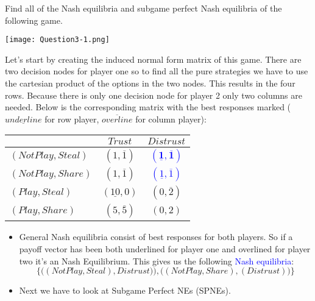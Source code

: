 \documentclass[../main.tex]{subfiles}
\begin{document}
\begin{question}
    Find all of the Nash equilibria and subgame perfect Nash equilibria of the following game.

    \centering
    \texttt{[image: Question3-1.png]}
\end{question}

\begin{solution} 
Let's start by creating the induced normal form matrix of this game. 
There are two decision nodes for player one so to find all the pure strategies we have to use the cartesian product of the options in the two nodes. This results in the four rows.
Because there is only one decision node for player 2 only two columns are needed.
Below is the corresponding matrix with the best responses marked ($\underline{underline}$ for row player, $\overline{overline}$ for column player): 
\begin{center}
	\setlength\extrarowheight{1pt} %
	\begin{tabular}{|l|c|c|}
		\hline
		& $Trust$ & $Distrust$ \\
		\hline
		$(Not Play,Steal)$ & $(1,\overline{1})$ & \textcolor{blue}{$\mathbf{(\underline{1},\overline{1})}$} \\
		\hline
		$(Not Play,Share)$ & $(1,\overline{1})$ & \textcolor{blue}{$(\underline{1},\overline{1})$} \\
		\hline
		$(Play,Steal)$ & $(\underline{10},0)$ & $(0,\overline{2})$ \\
		\hline
		$(Play,Share)$ & $(5,\overline{5})$ & $(0,2)$ \\
		\hline
	\end{tabular}
\end{center}
\begin{itemize}
	\item General Nash equilibria consist of best responses for both players. So if a payoff vector has been both underlined for player one and overlined for player two it's an Nash Equilibrium. This gives us the following \textcolor{blue}{Nash equilibria}: 
	$$\{\Big((Not Play, Steal),Distrust)\Big),\Big((Not Play, Share),(Distrust)\Big)\}$$
	\item Next we have to look at Subgame Perfect NEs (SPNEs).

\end{itemize}
\end{solution}
\end{document}
